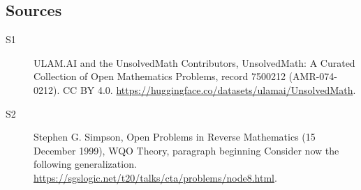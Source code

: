 \documentclass[11pt]{article}
\begin{document}
\subsection{Sources}
\begin{description}
\item[\hypertarget{source:7500212:1}{S1}] ULAM.AI and the UnsolvedMath Contributors, UnsolvedMath: A Curated Collection of Open Mathematics Problems, record 7500212 (AMR-074-0212). CC BY 4.0. \url{https://huggingface.co/datasets/ulamai/UnsolvedMath}.
\item[\hypertarget{source:7500212:2}{S2}] Stephen G. Simpson, Open Problems in Reverse Mathematics (15 December 1999), WQO Theory, paragraph beginning Consider now the following generalization. \url{https://sgslogic.net/t20/talks/cta/problems/node8.html}.
\end{description}
\label{end:7500212}
\end{document}
